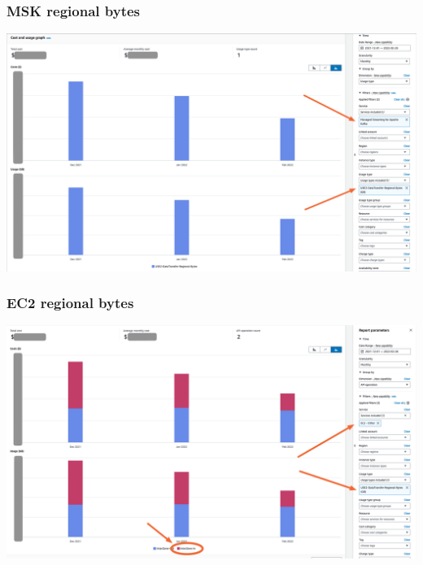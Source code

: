 \documentclass{beamer}
\begin{document}
\begin{frame}
  \frametitle{MSK regional bytes}

  \begin{center}
    \includegraphics[keepaspectratio,width=\textwidth,height=0.8\textheight]{msk.png}
  \end{center}
\end{frame}

\begin{frame}
  \frametitle{EC2 regional bytes}

  \begin{center}
    \includegraphics[keepaspectratio,width=\textwidth,height=0.8\textheight]{ec2.png}
  \end{center}
\end{frame}
\end{document}
